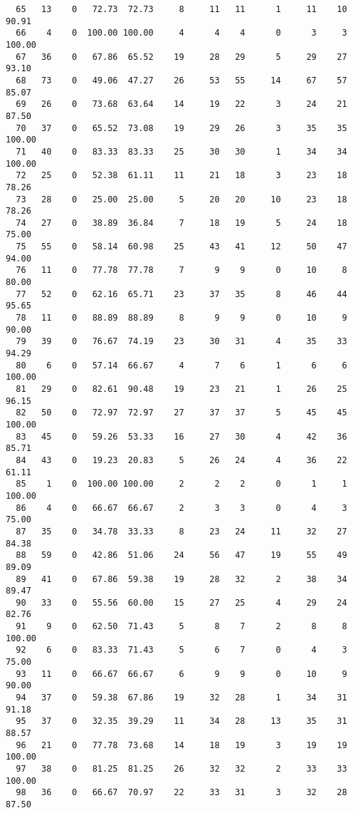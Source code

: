 \begin{verbatim}
  65   13    0   72.73  72.73     8     11   11      1     11    10    90.91
  66    4    0  100.00 100.00     4      4    4      0      3     3   100.00
  67   36    0   67.86  65.52    19     28   29      5     29    27    93.10
  68   73    0   49.06  47.27    26     53   55     14     67    57    85.07
  69   26    0   73.68  63.64    14     19   22      3     24    21    87.50
  70   37    0   65.52  73.08    19     29   26      3     35    35   100.00
  71   40    0   83.33  83.33    25     30   30      1     34    34   100.00
  72   25    0   52.38  61.11    11     21   18      3     23    18    78.26
  73   28    0   25.00  25.00     5     20   20     10     23    18    78.26
  74   27    0   38.89  36.84     7     18   19      5     24    18    75.00
  75   55    0   58.14  60.98    25     43   41     12     50    47    94.00
  76   11    0   77.78  77.78     7      9    9      0     10     8    80.00
  77   52    0   62.16  65.71    23     37   35      8     46    44    95.65
  78   11    0   88.89  88.89     8      9    9      0     10     9    90.00
  79   39    0   76.67  74.19    23     30   31      4     35    33    94.29
  80    6    0   57.14  66.67     4      7    6      1      6     6   100.00
  81   29    0   82.61  90.48    19     23   21      1     26    25    96.15
  82   50    0   72.97  72.97    27     37   37      5     45    45   100.00
  83   45    0   59.26  53.33    16     27   30      4     42    36    85.71
  84   43    0   19.23  20.83     5     26   24      4     36    22    61.11
  85    1    0  100.00 100.00     2      2    2      0      1     1   100.00
  86    4    0   66.67  66.67     2      3    3      0      4     3    75.00
  87   35    0   34.78  33.33     8     23   24     11     32    27    84.38
  88   59    0   42.86  51.06    24     56   47     19     55    49    89.09
  89   41    0   67.86  59.38    19     28   32      2     38    34    89.47
  90   33    0   55.56  60.00    15     27   25      4     29    24    82.76
  91    9    0   62.50  71.43     5      8    7      2      8     8   100.00
  92    6    0   83.33  71.43     5      6    7      0      4     3    75.00
  93   11    0   66.67  66.67     6      9    9      0     10     9    90.00
  94   37    0   59.38  67.86    19     32   28      1     34    31    91.18
  95   37    0   32.35  39.29    11     34   28     13     35    31    88.57
  96   21    0   77.78  73.68    14     18   19      3     19    19   100.00
  97   38    0   81.25  81.25    26     32   32      2     33    33   100.00
  98   36    0   66.67  70.97    22     33   31      3     32    28    87.50

\end{verbatim}
